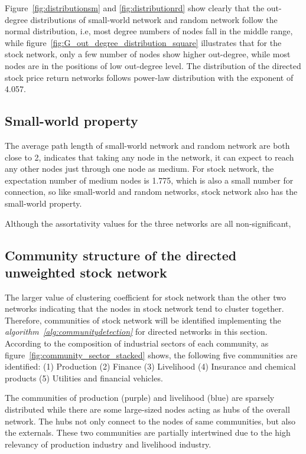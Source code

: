Figure~\ref{fig:distributionsm} and \ref{fig:distributionrd} show clearly that the out-degree distributions of small-world network and random network follow the normal distribution, i.e, most degree numbers of nodes fall in the middle range, while figure~\ref{fig:G_out_degree_distribution_square} illustrates that for the stock network, only a few number of nodes show higher out-degree, while most nodes are in the positions of low out-degree level. The distribution of the directed stock price return networks follows power-law distribution with the exponent of 4.057.

\subsection{Small-world property}
The average path length of small-world network and random network are both close to 2, indicates that taking any node in the network, it can expect to reach any other nodes just through one node as medium. For stock network, the expectation number of medium nodes is 1.775, which is also a small number for connection, so like small-world and random networks, stock network also has the small-world property.


Although the assortativity values for the three networks are all non-significant, 

\subsection{Community structure of the directed unweighted stock network}
The larger value of clustering coefficient for stock network than the other two networks indicating that the nodes in stock network tend to cluster together. Therefore, communities of stock network will be identified implementing the \textit{algorithm~\ref{alg:communitydetection}} for directed networks in this section. According to the composition of industrial sectors of each community, as figure~\ref{fig:community_sector_stacked} shows, the following five communities are identified: (1) Production (2) Finance (3) Livelihood (4) Insurance and chemical products (5) Utilities and financial vehicles.

The communities of production (purple) and livelihood (blue) are sparsely distributed while there are some large-sized nodes acting as hubs of the overall network. The hubs not only connect to the nodes of same communities, but also the externals. These two communities are partially intertwined due to the high relevancy of production industry and livelihood industry. 

